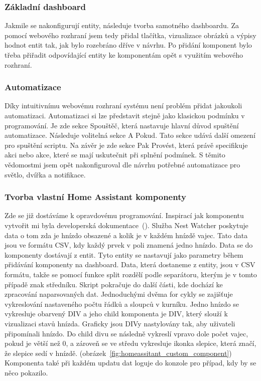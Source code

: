 
\subsubsection*{Základní dashboard}
Jakmile se nakonfigurují entity, následuje tvorba samotného dashboardu.
Za pomocí webového rozhraní jsem tedy přidal tlačítka, vizualizace obrázků a výpisy hodnot entit tak, jak bylo rozebráno dříve v návrhu.
Po přidání komponent bylo třeba přiřadit odpovídající entity ke komponentám opět s využitím webového rozhraní.

\subsubsection*{Automatizace}
Díky intuitivnímu webovému rozhraní systému není problém přidat jakoukoli automatizaci.
Automatizaci si lze představit stejně jako klasickou podmínku v programování.
Je zde sekce Spouštěč, která nastavuje hlavní důvod spuštění automatizace.
Následuje volitelná sekce A Pokud.
Tato sekce udává další omezení pro spuštění scriptu.
Na závěr je zde sekce Pak Provést, která právě specifikuje akci nebo akce, které se mají uskutečnit při splnění podmínek.
S těmito vědomostmi jsem opět nakonfiguroval dle návrhu potřebné automatizace pro světlo, dvířka a notifikace.


\subsubsection*{Tvorba vlastní Home Assistant komponenty}
Zde se již dostáváme k opravdovému programování. Inspirací jak komponentu vytvořit mi byla developerská dokumentace~(\cite{homeassistant-developers}).
Služba Nest Watcher poskytuje data o tom zda je hnízdo obsazené a kolik je v každém hnízdě vajec.
Tato data jsou ve formátu CSV, kdy každý prvek v poli znamená jedno hnízdo.
Data se do komponenty dostávají z entit.
Tyto entity se nastavují jako parametry během přidávání komponenty na dashboard.
Data, která dostaneme z entity, jsou v CSV formátu, takže se pomocí funkce split rozdělí podle separátoru, kterým je v tomto případě znak středníku.
Skript pokračuje do další části, kde dochází ke zpracování naparsovaných dat.
Jednoduchými dvěma for cykly se zajišťuje vykreslování nastaveného počtu řádků a sloupců v kurníku.
Jedno hnízdo se vykresluje obarvený DIV a jeho child komponenta je DIV, který slouží k vizualizaci stavů hnízda.
Graficky jsou DIVy nastylovány tak, aby uživateli připomínali hnízdo.
Do child divu se následně vykreslí vpravo dole počet vajec, pokud je větší než 0, a zároveň se ve středu vykresluje ikonka slepice, která značí, že slepice sedí v hnízdě. (obrázek~\ref{fig:homeassitant_custom_component})
Komponenta také při každém updatu dat loguje do konzole pro případ, kdy by se něco pokazilo.

